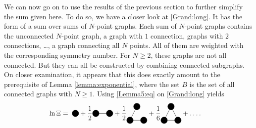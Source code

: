 \documentclass[8.5pt,twoside,twocolumn]{article}
\theoremstyle{standard}
\newcommand\fp[2]{\draw {#1} node[circle,minimum size=0.2cm,draw,fill=black]
({#2}) {};} %
\begin{document}
We can now go on to use the results of the previous section to further simplify the
sum given here. To do so, we have a closer look at \eqref{Grand:long}. It has the form of
a sum over sums of $N$-point graphs. Each sum of $N$-point graphs contains the unconnected $N$-point
graph, a graph with $1$ connection, graphs with $2$ connections, \ldots, a graph connecting all $N$ points.
All of them are weighted with the corresponding symmetry number. For $N \ge 2$, these graphs are not all
connected. But they can all be constructed by combining connected subgraphs. On closer examination, it appears that
this does exactly amount to the prerequisite of Lemma \ref{lemma:exponential}, where the set $B$ is the
set of all connected graphs with $N \ge 1$. Using \eqref{Lemma5:eq} on \eqref{Grand:long} yields
\begin{equation}
\begin{aligned}
\ln \Xi&=
\ph{.}\begin{tikzpicture}[baseline={([yshift=-.3em]current
bounding box.center)}]
  \fp{(0,0)}{A}
\end{tikzpicture}
+
\frac 1 2
\begin{tikzpicture}[baseline={([yshift=-.3em]current bounding box.center)}]
  \draw(0,0) node[circle,minimum size=.2cm,draw,fill=black] (A) {};
  \draw(.7,0) node[circle,minimum size=.2cm,draw,fill=black] (B) {};
  \draw (A.center) --  (B.center);
\end{tikzpicture}
+\frac 1 2
\begin{tikzpicture}[baseline={([yshift=-.3em]current bounding box.center)}]
  \draw(0,0) node[circle,minimum size=.2cm,draw,fill=black] (A) {};
  \draw(.7,0) node[circle,minimum size=.2cm,draw,fill=black] (B) {};
  \draw(.35,.7) node[circle,minimum size=.2cm,draw,fill=black] (C) {};
  \draw (A.center) --  (B.center);
  \draw (A.center) --  (C.center);
\end{tikzpicture}
+
\frac 1 6
\begin{tikzpicture}[baseline={([yshift=-.3em]current bounding box.center)}]
  \draw(0,0) node[circle,minimum size=.2cm,draw,fill=black] (A) {};
  \draw(.7,0) node[circle,minimum size=.2cm,draw,fill=black] (B) {};
  \draw(.35,.7) node[circle,minimum size=.2cm,draw,fill=black] (C) {};
  \draw (A.center) --  (B.center);
  \draw (A.center) --  (C.center);
  \draw (B.center) --  (C.center);
\end{tikzpicture}
 + \ldots .

\end{aligned}
\end{equation}
\end{document}
